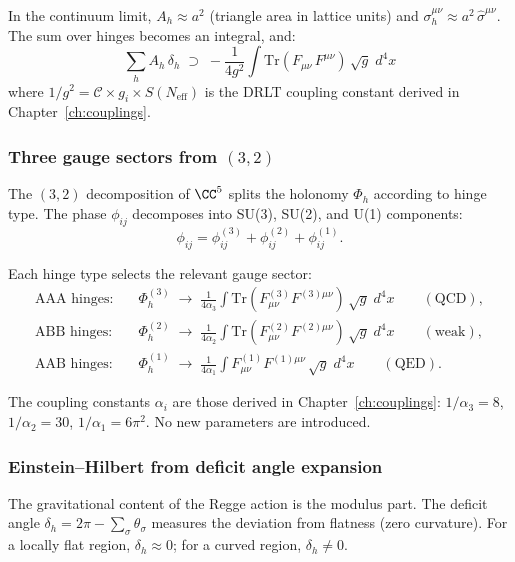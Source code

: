 In the continuum limit, $A_h \approx a^2$ (triangle area in lattice units) and $\sigma^{\mu\nu}_h \approx a^2\,\hat{\sigma}^{\mu\nu}$.  The sum over hinges becomes an integral, and:
\begin{equation}
\boxed{\sum_h A_h\,\delta_h \;\supset\; -\frac{1}{4g^2}\int \text{Tr}(F_{\mu\nu}\,F^{\mu\nu})\,\sqrt{g}\;d^4x}
\end{equation}
where $1/g^2 = \mathcal{C} \times g_i \times S(N_\text{eff})$ is the DRLT coupling constant derived in Chapter~\ref{ch:couplings}.

\subsubsection{Three gauge sectors from $(3,2)$}

The $(3,2)$ decomposition of $\CC^5$ splits the holonomy $\Phi_h$ according to hinge type.  The phase $\phi_{ij}$ decomposes into SU(3), SU(2), and U(1) components:
\begin{equation}
\phi_{ij} = \phi^{(3)}_{ij} + \phi^{(2)}_{ij} + \phi^{(1)}_{ij}.
\end{equation}

Each hinge type selects the relevant gauge sector:
\begin{align}
\text{AAA hinges:} &\quad \Phi^{(3)}_h \;\to\; \frac{1}{4\alpha_3}\int\text{Tr}(F^{(3)}_{\mu\nu}F^{(3)\mu\nu})\,\sqrt{g}\;d^4x \qquad (\text{QCD}), \\
\text{ABB hinges:} &\quad \Phi^{(2)}_h \;\to\; \frac{1}{4\alpha_2}\int\text{Tr}(F^{(2)}_{\mu\nu}F^{(2)\mu\nu})\,\sqrt{g}\;d^4x \qquad (\text{weak}), \\
\text{AAB hinges:} &\quad \Phi^{(1)}_h \;\to\; \frac{1}{4\alpha_1}\int F^{(1)}_{\mu\nu}F^{(1)\mu\nu}\,\sqrt{g}\;d^4x \qquad (\text{QED}).
\end{align}

The coupling constants $\alpha_i$ are those derived in Chapter~\ref{ch:couplings}: $1/\alpha_3 = 8$, $1/\alpha_2 = 30$, $1/\alpha_1 = 6\pi^2$.  No new parameters are introduced.

\subsubsection{Einstein--Hilbert from deficit angle expansion}

The gravitational content of the Regge action is the modulus part.  The deficit angle $\delta_h = 2\pi - \sum_\sigma \theta_\sigma$ measures the deviation from flatness (zero curvature).  For a locally flat region, $\delta_h \approx 0$; for a curved region, $\delta_h \ne 0$.

